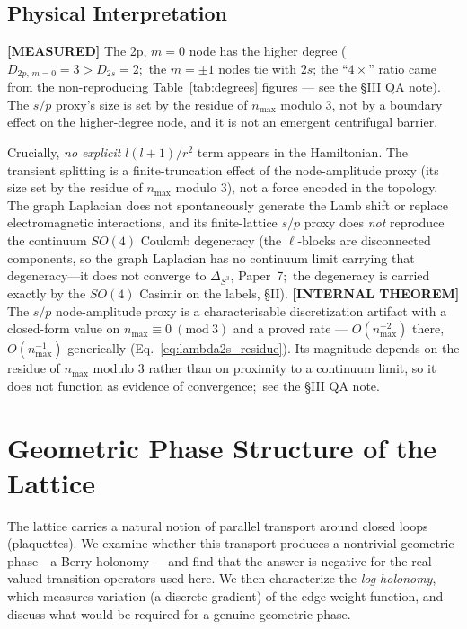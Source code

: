 \documentclass[aps,pra,twocolumn,superscriptaddress,longbibliography]{revtex4-2}
\begin{document}
\subsection{Physical Interpretation}

\textbf{[MEASURED]} The 2p, $m = 0$ node has the higher degree
($D_{2p,\,m=0} = 3 > D_{2s} = 2$;\ the $m = \pm1$ nodes tie with $2s$; the ``$4 \times$'' ratio came from the
non-reproducing Table~\ref{tab:degrees} figures --- see the \S III QA
note).  The $s/p$ proxy's size is set by the residue of $n_{\max}$ modulo
$3$, not by a boundary effect on the higher-degree node, and it is not an
emergent centrifugal barrier.

Crucially, \textit{no explicit} $l(l+1)/r^2$ term appears in the
Hamiltonian. The transient splitting is a finite-truncation effect of
the node-amplitude proxy (its size set by the residue of $n_{\max}$
modulo $3$), not a force encoded in the topology.
The graph Laplacian does not spontaneously generate the Lamb shift
or replace electromagnetic interactions, and its finite-lattice $s/p$ proxy
does \emph{not} reproduce the continuum $SO(4)$ Coulomb degeneracy (the
$\ell$-blocks are disconnected components, so the graph Laplacian has no
continuum limit carrying that degeneracy---it does not converge to
$\Delta_{S^3}$, Paper~7;\ the degeneracy is carried exactly by the $SO(4)$
Casimir on the labels, \S II).  \textbf{[INTERNAL THEOREM]} The $s/p$
node-amplitude proxy is a characterisable discretization artifact with a
closed-form value on $n_{\max} \equiv 0 \ (\mathrm{mod}\ 3)$ and a proved
rate --- $O(n_{\max}^{-2})$ there, $O(n_{\max}^{-1})$ generically
(Eq.~\eqref{eq:lambda2s_residue}).  Its magnitude depends on the residue of $n_{\max}$
modulo $3$ rather than on proximity to a continuum limit, so it does not
function as evidence of convergence;\ see the \S III QA note.


\section{Geometric Phase Structure of the Lattice}
\label{sec:relativity}

The lattice carries a natural notion of parallel transport around closed loops
(plaquettes).  We examine whether this transport produces a nontrivial
geometric phase---a Berry holonomy~\cite{berry1984}---and find that the answer is negative for
the real-valued transition operators used here.  We then characterize the
\emph{log-holonomy}, which measures variation (a discrete gradient) of the edge-weight function,
and discuss what would be required for a genuine geometric phase.
\end{document}
